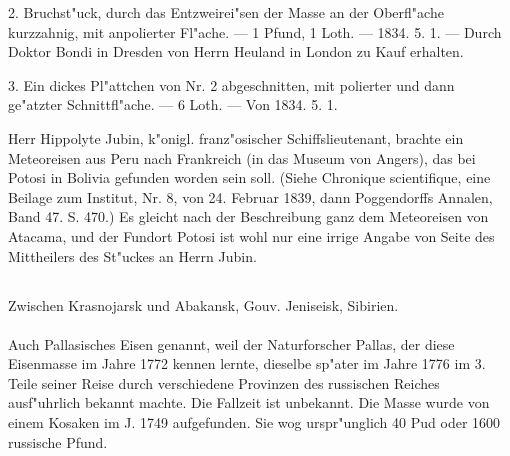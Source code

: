 \documentclass[a4paper, 11pt, oneside, polutonikogreek, german]{article}
\begin{document}
2. Bruchst"uck, durch das Entzweirei"sen der Masse an der Oberfl"ache kurzzahnig, mit anpolierter Fl"ache. --- 1 Pfund, 1 Loth. --- 1834. 5. 1. --- Durch Doktor Bondi in Dresden von Herrn Heuland in London zu Kauf erhalten.

3. Ein dickes Pl"attchen von Nr. 2 abgeschnitten, mit polierter und dann ge"atzter Schnittfl"ache. --- 6 Loth. --- Von 1834. 5. 1.

\setlength{\leftskip}{10mm}
\setlength{\parindent}{0pt}

{\footnotesize Herr Hippolyte Jubin, k"onigl. franz"osischer Schiffslieutenant, brachte ein Meteoreisen aus Peru nach Frankreich (in das Museum von Angers), das bei Potosi in Bolivia gefunden worden sein soll. (Siehe Chronique scientifique, eine Beilage zum Institut, Nr. 8, von 24. Februar 1839, dann Poggendorffs Annalen, Band 47. S. 470.) Es gleicht nach der Beschreibung ganz dem Meteoreisen von Atacama, und der Fundort Potosi ist wohl nur eine irrige Angabe von Seite des Mittheilers des St"uckes an Herrn Jubin.}

\setlength{\leftskip}{0pt}
\setlength{\parindent}{20pt}

\subsection{}
\begin{center}

Zwischen Krasnojarsk und Abakansk, Gouv. Jeniseisk, Sibirien.
\end{center}
\paragraph{}
Auch Pallasisches Eisen genannt, weil der Naturforscher Pallas, der diese Eisenmasse im Jahre 1772 kennen lernte, dieselbe sp"ater im Jahre 1776 im 3. Teile seiner Reise durch verschiedene Provinzen des russischen Reiches ausf"uhrlich bekannt machte. Die Fallzeit ist unbekannt. Die Masse wurde von einem Kosaken im J. 1749 aufgefunden. Sie wog urspr"unglich 40 Pud oder 1600 russische Pfund.

\setlength{\leftskip}{10mm}
\setlength{\parindent}{0pt}
\end{document}
